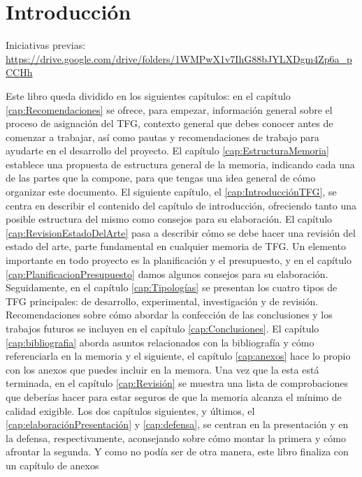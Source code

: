 \chapter{Introducción}
\label{cap:Introducción}
Iniciativas previas: \url{https://drive.google.com/drive/folders/1WMPwX1v7IhG88bJYLXDgm4Zp6a_pCCHh}


Este libro queda dividido en los siguientes capítulos: en el capítulo \ref{cap:Recomendaciones} se ofrece, para empezar, información general sobre el proceso de asignación del TFG, contexto general que debes conocer antes de comenzar a trabajar, así como pautas y recomendaciones de trabajo para ayudarte en el desarrollo del proyecto. El capítulo \ref{cap:EstructuraMemoria} establece una propuesta de estructura general de la memoria, indicando cada una de las partes que la compone, para que tengas una idea general de cómo organizar este documento. El siguiente capítulo, el \ref{cap:IntroducciónTFG}, se centra en describir el contenido del capítulo de introducción, ofreciendo tanto una posible estructura del mismo como consejos para su elaboración. El capítulo \ref{cap:RevisionEstadoDelArte} pasa a describir cómo se debe hacer una revisión del estado del arte, parte fundamental en cualquier memoria de TFG. Un elemento importante en todo proyecto es la planificación y el presupuesto, y en el capítulo \ref{cap:PlanificacionPresupuesto} damos algunos consejos para su elaboración. Seguidamente, en el capítulo \ref{cap:Tipologías} se presentan los cuatro tipos de TFG principales: de desarrollo, experimental, investigación y de revisión. Recomendaciones sobre cómo abordar la confección de las conclusiones y los trabajos futuros se incluyen en el capítulo \ref{cap:Conclusiones}. El capítulo \ref{cap:bibliografia} aborda asuntos relacionados con la bibliografía y cómo referenciarla en la memoria y el siguiente, el capítulo \ref{cap:anexos} hace lo propio con los anexos que puedes incluir en la memora.  Una vez que la esta está terminada, en el capítulo \ref{cap:Revisión} se muestra una lista de comprobaciones que deberías hacer para estar seguros de que la memoria alcanza el mínimo de calidad exigible. Los dos capítulos siguientes, y últimos, el \ref{cap:elaboraciónPresentación} y \ref{cap:defensa}, se centran en la presentación y en la defensa, respectivamente, aconsejando sobre cómo montar la primera y cómo afrontar la segunda. Y como no podía ser de otra manera, este libro finaliza con un capítulo de anexos 
